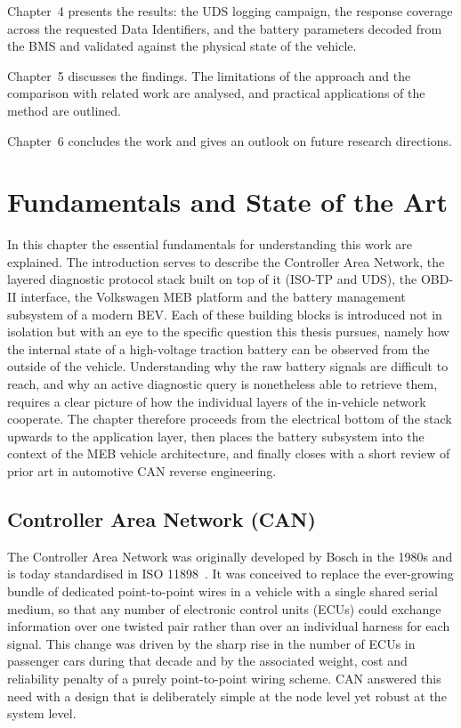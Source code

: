\documentclass[11pt,a4paper,oneside,parskip=half]{scrreprt}
\begin{document}
Chapter~4 presents the results: the UDS logging campaign, the response coverage across the requested Data Identifiers, and the battery parameters decoded from the BMS and validated against the physical state of the vehicle.

Chapter~5 discusses the findings. The limitations of the approach and the comparison with related work are analysed, and practical applications of the method are outlined.

Chapter~6 concludes the work and gives an outlook on future research directions.


\chapter{Fundamentals and State of the Art}
In this chapter the essential fundamentals for understanding this work are explained. The introduction serves to describe the Controller Area Network, the layered diagnostic protocol stack built on top of it (ISO-TP and UDS), the OBD-II interface, the Volkswagen MEB platform and the battery management subsystem of a modern BEV. Each of these building blocks is introduced not in isolation but with an eye to the specific question this thesis pursues, namely how the internal state of a high-voltage traction battery can be observed from the outside of the vehicle. Understanding why the raw battery signals are difficult to reach, and why an active diagnostic query is nonetheless able to retrieve them, requires a clear picture of how the individual layers of the in-vehicle network cooperate. The chapter therefore proceeds from the electrical bottom of the stack upwards to the application layer, then places the battery subsystem into the context of the MEB vehicle architecture, and finally closes with a short review of prior art in automotive CAN reverse engineering.

\section{Controller Area Network (CAN)}
The Controller Area Network was originally developed by Bosch in the 1980s and is today standardised in ISO 11898~\cite{iso11898}. It was conceived to replace the ever-growing bundle of dedicated point-to-point wires in a vehicle with a single shared serial medium, so that any number of electronic control units (ECUs) could exchange information over one twisted pair rather than over an individual harness for each signal. This change was driven by the sharp rise in the number of ECUs in passenger cars during that decade and by the associated weight, cost and reliability penalty of a purely point-to-point wiring scheme. CAN answered this need with a design that is deliberately simple at the node level yet robust at the system level.
\end{document}
